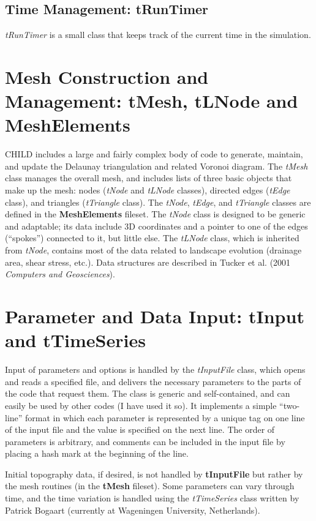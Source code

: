 \documentclass[12pt]{article}
\begin{document}
\subsection{Time Management: tRunTimer}

{\em tRunTimer} is a small class that keeps track of the current time in the 
simulation.

\section{Mesh Construction and Management: tMesh, tLNode and MeshElements}

CHILD includes a large and fairly complex body of code to generate, maintain, 
and update the Delaunay triangulation and related Voronoi diagram. The 
{\em tMesh} class manages the overall mesh, and includes lists of three basic 
objects that make up the mesh: nodes ({\em tNode} and {\em tLNode} classes), 
directed edges ({\em tEdge} class), and triangles ({\em tTriangle} class). The 
{\em tNode}, {\em tEdge}, and {\em tTriangle} classes are defined in the 
{\bf MeshElements} fileset. The {\em tNode} class is designed to be generic 
and adaptable; its data include 3D coordinates and a pointer to one of the 
edges (``spokes'') connected to it, but little else. The {\em tLNode} class, 
which is inherited from {\em tNode}, contains most of the data related to 
landscape evolution (drainage area, shear stress, etc.). Data structures are 
described in Tucker et al. (2001 {\em Computers and Geosciences}).

\section{Parameter and Data Input: tInput and tTimeSeries}

Input of parameters and options is handled by the {\em tInputFile} class, which opens and reads a specified file, and delivers the necessary parameters to the parts of the code that request them. The class is generic and self-contained, and can easily be used by other codes (I have used it so). It implements a simple ``two-line'' format in which each parameter is represented by a unique tag on one line of the input file and the value is specified on the next line. The order of parameters is arbitrary, and comments can be included in the input file by placing a hash mark at the beginning of the line.

Initial topography data, if desired, is not handled by {\bf tInputFile} but rather by the mesh routines (in the {\bf tMesh} fileset). Some parameters can vary through time, and the time variation is handled using the {\em tTimeSeries} class written by Patrick Bogaart (currently at Wageningen University, Netherlands).
\end{document}
